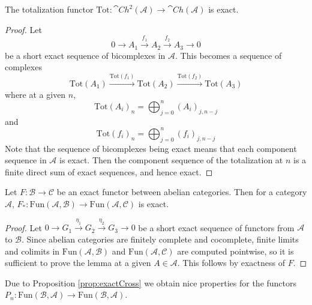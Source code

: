 \begin{lem}[label=lem:TotExact]
    The totalization functor $\text{Tot}:\cat{Ch}^2(\mathcal{A})\rightarrow \cat{Ch}(\mathcal{A})$ is exact.
\end{lem}
\begin{proof}
    Let 
    \begin{equation*}
        0\rightarrow A_1\xrightarrow{f_1} A_2\xrightarrow{f_2} A_3\rightarrow 0
    \end{equation*}
    be a short exact sequence of bicomplexes in $\mathcal{A}$. This becomes a sequence of complexes 
    \begin{equation*}
        \text{Tot}(A_1)\xrightarrow{\text{Tot}(f_1)}\text{Tot}(A_2)\xrightarrow{\text{Tot}(f_2)}\text{Tot}(A_3)
    \end{equation*}
    where at a given $n$,
    \begin{equation*}
        \text{Tot}(A_i)_n = \bigoplus_{j=0}^n(A_i)_{j,n-j}
    \end{equation*}
    and
    \begin{equation*}
        \text{Tot}(f_i)_n = \bigoplus_{j=0}^n (f_i)_{j,n-j}
    \end{equation*}
    Note that the sequence of bicomplexes being exact means that each component sequence in $\mathcal{A}$ is exact. Then the component sequence of the totalization at $n$ is a finite direct sum of exact sequences, and hence exact.
\end{proof}

\begin{lem}[label=pushForward]
    Let $F:\mathcal{B}\rightarrow \mathcal{C}$ be an exact functor between abelian categories. Then for a category $\mathcal{A}$, $F_*:\text{Fun}(\mathcal{A},\mathcal{B})\rightarrow \text{Fun}(\mathcal{A},\mathcal{C})$ is exact.
\end{lem}
\begin{proof}
    Let $0\rightarrow G_1\xrightarrow{\eta_1} G_2\xrightarrow{\eta_2} G_3\rightarrow 0$ be a short exact sequence of functors from $\mathcal{A}$ to $\mathcal{B}$. Since abelian categories are finitely complete and cocomplete, finite limits and colimits in $\text{Fun}(\mathcal{A},\mathcal{B})$ and $\text{Fun}(\mathcal{A},\mathcal{C})$ are computed pointwise, so it is sufficient to prove the lemma at a given $A \in \mathcal{A}$. This follows by exactness of $F$.
\end{proof}

Due to Proposition \ref{prop:exactCross} we obtain nice properties for the functors $P_n:\text{Fun}(\mathcal{B},\mathcal{A})\rightarrow \text{Fun}(\mathcal{B},\mathcal{A})$.

